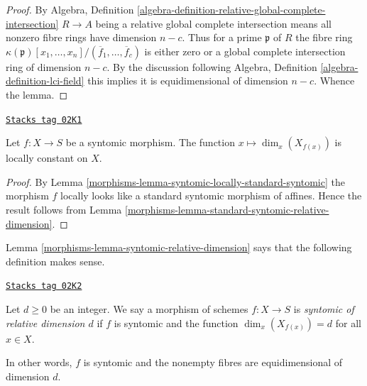 \begin{proof}
By Algebra,
Definition \ref{algebra-definition-relative-global-complete-intersection}
$R \to A$ being a relative global complete intersection means
all nonzero fibre rings have dimension $n - c$.
Thus for a prime $\mathfrak p$ of $R$ the fibre ring
$\kappa(\mathfrak p)[x_1, \ldots, x_n]/(\overline{f}_1, \ldots, \overline{f}_c)$
is either zero or a global complete intersection ring of dimension $n - c$.
By the discussion following
Algebra, Definition \ref{algebra-definition-lci-field}
this implies it is equidimensional of dimension $n - c$.
Whence the lemma.
\end{proof}

\begin{lemma}
\label{morphisms-lemma-syntomic-relative-dimension}
\href{https://stacks.math.columbia.edu/tag/02K1}{\texttt{Stacks tag 02K1}}

Let $f : X \to S$ be a syntomic morphism. The function
$x \mapsto \dim_x(X_{f(x)})$ is locally constant on $X$.
\end{lemma}

\begin{proof}

By Lemma \ref{morphisms-lemma-syntomic-locally-standard-syntomic}
the morphism $f$ locally looks like a standard
syntomic morphism of affines. Hence the result follows
from Lemma \ref{morphisms-lemma-standard-syntomic-relative-dimension}.
\end{proof}

Lemma \ref{morphisms-lemma-syntomic-relative-dimension}
says that the following definition makes sense.

\begin{definition}
\label{morphisms-definition-syntomic-relative-dimension}
\href{https://stacks.math.columbia.edu/tag/02K2}{\texttt{Stacks tag 02K2}}

Let $d \geq 0$ be an integer. We say a morphism of schemes $f : X \to S$
is {\it syntomic of relative dimension $d$} if $f$ is syntomic and
the function $\dim_x(X_{f(x)}) = d$ for all $x \in X$.
\end{definition}

In other words, $f$ is syntomic and the nonempty fibres are equidimensional
of dimension $d$.

